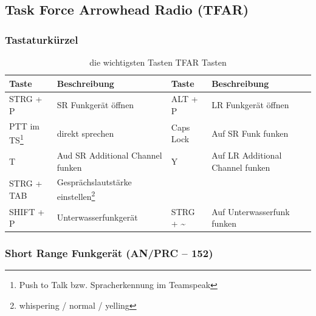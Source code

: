 \subsection{Task Force Arrowhead Radio (TFAR)}
\label{TFAR}
\subsubsection{Tastaturkürzel}
\begin{longtable}{|p{2cm}|p{5 cm}||p{2cm}|p{4cm}|} 
	\caption[Trupp]{die wichtigsten Tasten TFAR Tasten} \\ 
	\hline
	\cellcolor{backcolor} \textbf{Taste} & \textbf{Beschreibung} & \cellcolor{backcolor}\textbf{Taste} & \textbf{Beschreibung}  \\ 
	\hline
	\cellcolor{backcolor} STRG + P & SR Funkgerät öffnen & \cellcolor{backcolor}  ALT + P &  LR Funkgerät öffnen \\
	\hline
	\cellcolor{backcolor} PTT im TS\footnote{Push to Talk bzw. Spracherkennung im Teamspeak} & direkt sprechen & \cellcolor{backcolor}  Caps Lock & Auf SR Funk funken \\
	 \hline
	\cellcolor{backcolor} T & Aud SR Additional Channel funken & \cellcolor{backcolor}  Y & Auf LR Additional Channel funken \\
	 \hline
	\cellcolor{backcolor} STRG + TAB & Gesprächslautstärke einstellen\footnote{whispering / normal / yelling} & \cellcolor{backcolor}  & \\
	 \hline
	\cellcolor{backcolor} SHIFT + P & Unterwasserfunkgerät & \cellcolor{backcolor}  STRG + \~ & Auf Unterwasserfunk funken \\
	 \hline
\end{longtable}
\subsubsection{Short Range Funkgerät (AN/PRC – 152)}

